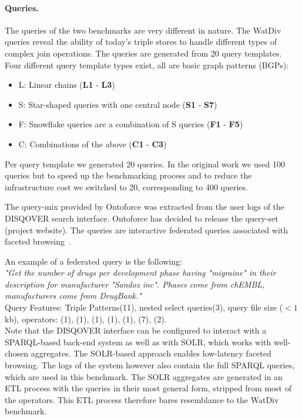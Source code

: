 \paragraph{Queries.} 
The queries of the two benchmarks are very different in nature. 
The WatDiv queries reveal the ability of today's triple stores to handle different types of complex join operations.
The queries are generated from 20 query templates. Four different query template types exist, all are basic graph patterns (BGPs): 
\begin{itemize}
	\item L: Linear chains (\textbf{L1} - \textbf{L3})
	\item S: Star-shaped queries with one central node (\textbf{S1} - \textbf{S7})
	\item F: Snowflake queries are a combination of S queries (\textbf{F1} - \textbf{F5})
	\item C: Combinations of the above (\textbf{C1} - \textbf{C3})
\end{itemize}
Per query template we generated 20 queries. In the original work we used 100 queries but to speed up the benchmarking process and to reduce the infrastructure cost we switched to 20, corresponding to 400 queries.

The query-mix provided by Ontoforce was extracted from the user logs of the DISQOVER search interface. Ontoforce has decided to release the query-set (project website).
The queries are interactive federated queries associated with faceted browsing~\cite{Ferre, Oren}.

An example of a federated query is the following: \\

\textit{"Get the number of drugs per development phase having "migraine"
in their description for manufacturer "Sandoz inc". Phases come
from chEMBL, manufacturers come from DrugBank."} \\

Query Features: Triple Patterns(11), nested select queries(3), query file size ($<1$kb), operators: (1), (1), (1), (1), (1), (7), (2).  \\

Note that the DISQOVER interface can be configured to interact with a SPARQL-based back-end system as well as with SOLR, which works with well-chosen aggregates. The SOLR-based approach enables low-latency faceted browsing. The logs of the system however also contain the full SPARQL queries, which are used in this benchmark. 
The SOLR aggregates are generated in an ETL process with the queries in their most general form, stripped from most of the operators. This ETL process therefore bares resemblance to the WatDiv benchmark.


